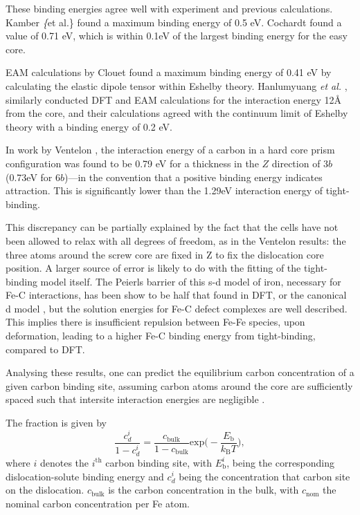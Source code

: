 \documentclass[a4paper,11pt]{article}
\begin{document}
These binding energies agree well with experiment and previous calculations.  Kamber \emph\{et
al.\} found a maximum binding energy of 0.5 eV. Cochardt found a value of 0.71 eV, which is
within 0.1eV of the largest binding energy for the easy core.

EAM calculations by Clouet \cite{Clouet2008,Becquart2007} found a maximum binding energy of 0.41 eV by
calculating the elastic dipole tensor within Eshelby theory. Hanlumyuang \emph{et al.}
\cite{Hanlumyuang2010}, similarly conducted DFT and EAM calculations for the interaction energy
12\AA{} from the core, and their calculations agreed with the continuum limit of Eshelby theory with
a binding energy of 0.2 eV.

In work by Ventelon \cite{Ventelon2015}, the interaction energy of a carbon in a hard
core prism configuration was found to be 0.79 eV for a thickness in the \(Z\) direction of 3\(b\) (0.73eV for \(6b\))---in the
convention that a positive binding energy indicates attraction. This is significantly lower than
the 1.29eV interaction energy of tight-binding. 

This discrepancy can be partially explained by the fact that the cells have not been allowed to
relax with all degrees of freedom, as in the Ventelon results: the three atoms around the screw
core are fixed in Z to fix the dislocation core position. A larger source of error is likely
to do with the fitting of the tight-binding model itself. The Peierls barrier of this s-d model
of iron, necessary for Fe-C interactions, has been show to be half that found in DFT, or the
canonical d model \cite{Simpson2019}, but the solution energies for Fe-C defect complexes are well
described. This implies there is insufficient repulsion between Fe-Fe species, upon deformation,
leading to a higher Fe-C binding energy from tight-binding, compared to DFT.


Analysing these results, one can predict the equilibrium carbon concentration of a given carbon
binding site, assuming carbon atoms around the core are sufficiently spaced such that intersite
interaction energies are negligible \cite{Ventelon2015}.

The fraction is given by 
\[  \frac{ c_d^{i} }{1 -  c_d^{i} } = \frac{ c_{\text{bulk}}^{} }{1 - c_{\text{bulk}} } \text{exp} \Big( -
    \frac{E_{\text{b}} }{k_{\text{B}}T}  \Big), \]
where \(i\) denotes the \(i^{\text{th}}\) carbon binding site, with \(E_{\text{b}}^{i}\), being the
corresponding dislocation-solute binding energy and \(c_d^{i}\) being the concentration that carbon
site on the dislocation. \(c_{\text{bulk}}^{}\) is the carbon concentration in the bulk, with
\(c_{\text{nom}}^{}\) the nominal carbon concentration per Fe atom.
\end{document}
